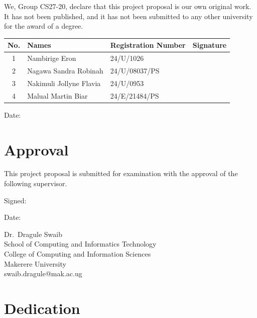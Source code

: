 \documentclass[12pt,a4paper]{report}
\makeatletter
\newcommand{\groupname}{CS27-20}
\newcommand{\supervisor}{Dr.\ Dragule Swaib}
\newcommand{\supervisoremail}{swaib.dragule@mak.ac.ug}
\newcommand{\doctypelower}{project proposal}
\makeatother
\begin{document}
We, Group \groupname, declare that this \doctypelower{} is our own original work. It has not been published, and it has not been submitted to any other university for the award of a degree.

\vspace{0.8em}
\renewcommand{\arraystretch}{2.1}
\begin{tabular}{@{}c>{\raggedright\arraybackslash}p{5.3cm}l>{\raggedright\arraybackslash}p{3.4cm}@{}}
\hline
\textbf{No.} & \textbf{Names} & \textbf{Registration Number} & \textbf{Signature}\\
\hline
1 & Nambirige Eron & 24/U/1026 & \\
2 & Nagawa Sandra Robinah & 24/U/08037/PS & \\
3 & Nakimuli Jollyne Flavia & 24/U/0953 & \\
4 & Malual Martin Biar & 24/E/21484/PS & \\
\hline
\end{tabular}
\renewcommand{\arraystretch}{1}

\vspace{1.5em}
Date: \dotfill\hspace{4cm}

\chapter*{Approval}

This \doctypelower{} is submitted for examination with the approval of the following supervisor.

\vspace{2em}
Signed: \dotfill\hspace{4cm}

\vspace{1.2em}
Date: \dotfill\hspace{4cm}

\vspace{2em}
\supervisor\\
School of Computing and Informatics Technology\\
College of Computing and Information Sciences\\
Makerere University\\
\supervisoremail

\chapter*{Dedication}
\end{document}
